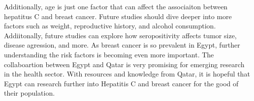 \documentclass[12pt, titlepage]{article}
\begin{document}
Additionally, age is just one factor that can affect the associaiton 
between hepatitus C and breast cancer. Future studies should dive 
deeper into more factors such as weight, reproductive history, 
and alcohol consumption. Addiitonally, future studies can explore how 
seropositivity affects tumor size, disease agression, and more. As 
breast cancer is so prevalent in Egypt, further understanding the 
risk factors is becoming even more important. The collaboartion between Egypt 
and Qatar is very promising for emerging research in the health sector. 
With resources and knowledge from Qatar, it is hopeful that Egypt 
can research further into Hepatitis C and breast cancer for the good 
of their population. 

\pagebreak



\end{document}
